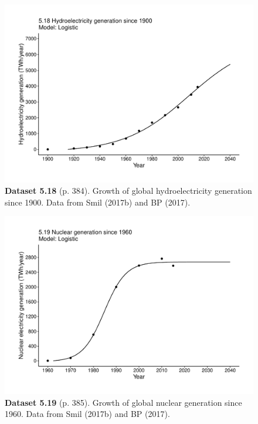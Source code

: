 \documentclass[aps,rmp,preprint,superscriptaddress,10pt,onecolumn]{article}
\begin{document}
\clearpage
\begin{figure}[h]
\includegraphics[width=\textwidth]{output/figs-ggplot/5.18.pdf}
\caption*{\textbf{Dataset 5.18} (p. 384). Growth of global hydroelectricity generation since 1900. Data from Smil (2017b) and BP (2017).}
\end{figure}
	
\clearpage
\begin{figure}[h]
\includegraphics[width=\textwidth]{output/figs-ggplot/5.19.pdf}
\caption*{\textbf{Dataset 5.19} (p. 385). Growth of global nuclear generation since 1960. Data from Smil (2017b) and BP (2017).}
\end{figure}
	
\end{document}

